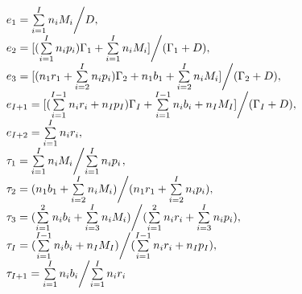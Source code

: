\documentclass[a4paper]{article}
\begin{document}
\[\begin{array}{l}
{e_1} = {{\sum\limits_{i = 1}^I {{n_i}{M_i}} } \mathord{\left/
 {\vphantom {{\sum\limits_{i = 1}^I {{n_i}{M_i}} } D}} \right.
 \kern-\nulldelimiterspace} D},\\
{e_2} = {{[(\sum\limits_{i = 1}^I {{n_i}{p_i}} ){\Gamma _1} + \sum\limits_{i = 1}^I {{n_i}{M_i}} ]} \mathord{\left/
 {\vphantom {{[(\sum\limits_{i = 1}^I {{n_i}{p_i}} ){\Gamma _1} + \sum\limits_{i = 1}^I {{n_i}{M_i}} ]} {({\Gamma _1} + D)}}} \right.
 \kern-\nulldelimiterspace} {({\Gamma _1} + D)}},\\
{e_3} = {{[({n_1}{r_1} + \sum\limits_{i = 2}^I {{n_i}{p_i}} ){\Gamma _2} + {n_1}{b_1} + \sum\limits_{i = 2}^I {{n_i}{M_i}} ]} \mathord{\left/
 {\vphantom {{[({n_1}{r_1} + \sum\limits_{i = 2}^I {{n_i}{p_i}} ){\Gamma _2} + {n_1}{b_1} + \sum\limits_{i = 2}^I {{n_i}{M_i}} ]} {({\Gamma _2} + D)}}} \right.
 \kern-\nulldelimiterspace} {({\Gamma _2} + D)}},\\
{e_{I + 1}} = {{[(\sum\limits_{i = 1}^{I - 1} {{n_i}{r_i}}  + {n_I}{p_I}){\Gamma _I} + \sum\limits_{i = 1}^{I - 1} {{n_i}{b_i}}  + {n_I}{M_I}]} \mathord{\left/
 {\vphantom {{[(\sum\limits_{i = 1}^{I - 1} {{n_i}{r_i}}  + {n_I}{p_I}){\Gamma _I} + \sum\limits_{i = 1}^{I - 1} {{n_i}{b_i}}  + {n_I}{M_I}]} {({\Gamma _I} + D)}}} \right.
 \kern-\nulldelimiterspace} {({\Gamma _I} + D)}},\\
{e_{I + 2}} = \sum\limits_{i = 1}^I {{n_i}{r_i}} ,\\
{\tau _1} = {{\sum\limits_{i = 1}^I {{n_i}{M_i}} } \mathord{\left/
 {\vphantom {{\sum\limits_{i = 1}^I {{n_i}{M_i}} } {\sum\limits_{i = 1}^I {{n_i}{p_i}} }}} \right.
 \kern-\nulldelimiterspace} {\sum\limits_{i = 1}^I {{n_i}{p_i}} }}{\kern 1pt} ,\\
{\tau _2} = {{({n_1}{b_1} + \sum\limits_{i = 2}^I {{n_i}{M_i}} )} \mathord{\left/
 {\vphantom {{({n_1}{b_1} + \sum\limits_{i = 2}^I {{n_i}{M_i}} )} {({n_1}{r_1} + \sum\limits_{i = 2}^I {{n_i}{p_i}} )}}} \right.
 \kern-\nulldelimiterspace} {({n_1}{r_1} + \sum\limits_{i = 2}^I {{n_i}{p_i}} )}},\\
{\tau _3} = {{(\sum\limits_{i = 1}^2 {{n_i}{b_i}}  + \sum\limits_{i = 3}^I {{n_i}{M_i}} )} \mathord{\left/
 {\vphantom {{(\sum\limits_{i = 1}^2 {{n_i}{b_i}}  + \sum\limits_{i = 3}^I {{n_i}{M_i}} )} {(\sum\limits_{i = 1}^2 {{n_i}{r_i}}  + \sum\limits_{i = 3}^I {{n_i}{p_i}} )}}} \right.
 \kern-\nulldelimiterspace} {(\sum\limits_{i = 1}^2 {{n_i}{r_i}}  + \sum\limits_{i = 3}^I {{n_i}{p_i}} )}},\\
{\tau _I} = {{(\sum\limits_{i = 1}^{I - 1} {{n_i}{b_i}}  + {n_I}{M_I})} \mathord{\left/
 {\vphantom {{(\sum\limits_{i = 1}^{I - 1} {{n_i}{b_i}}  + {n_I}{M_I})} {(\sum\limits_{i = 1}^{I - 1} {{n_i}{r_i}}  + {n_I}{p_I})}}} \right.
 \kern-\nulldelimiterspace} {(\sum\limits_{i = 1}^{I - 1} {{n_i}{r_i}}  + {n_I}{p_I})}},\\
{\tau _{I + 1}} = {{\sum\limits_{i = 1}^I {{n_i}{b_i}} } \mathord{\left/
 {\vphantom {{\sum\limits_{i = 1}^I {{n_i}{b_i}} } {\sum\limits_{i = 1}^I {{n_i}{r_i}} }}} \right.
 \kern-\nulldelimiterspace} {\sum\limits_{i = 1}^I {{n_i}{r_i}} }}
\end{array}\]
\end{document}
